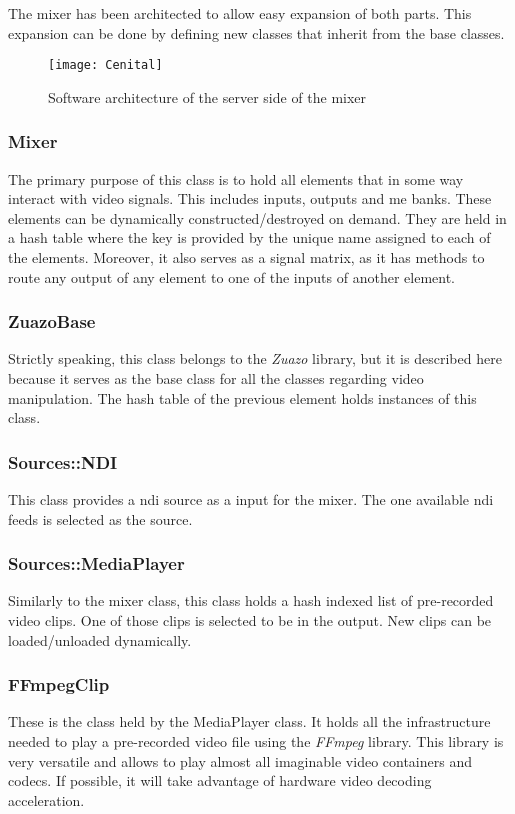 \documentclass[../main.tex]{subfiles}
\begin{document}
The mixer has been architected to allow easy expansion of both parts. This expansion can be done by defining new classes that inherit from the base classes.\newline

\begin{figure}[htbp]
    \centering
    \texttt{[image: Cenital]}

    \caption{Software architecture of the server side of the mixer}
    \label{fig:04:server_architecture}
\end{figure}

\subsubsection{Mixer}
The primary purpose of this class is to hold all elements that in some way interact with video signals. This includes inputs, outputs and \gls{me} banks. These elements can be dynamically constructed/destroyed on demand. They are held in a hash table where the key is provided by the unique name assigned to each of the elements. Moreover, it also serves as a signal matrix, as it has methods to route any output of any element to one of the inputs of another element. 

\subsubsection{ZuazoBase}
Strictly speaking, this class belongs to the \textit{Zuazo} library, but it is described here because it serves as the base class for all the classes regarding video manipulation. The hash table of the previous element holds instances of this class.

\subsubsection{Sources::NDI}
This class provides a \gls{ndi} source as a input for the mixer. The one available \gls{ndi} feeds is selected as the source.

\subsubsection{Sources::MediaPlayer}
Similarly to the mixer class, this class holds a hash indexed list of pre-recorded video clips. One of those clips is selected to be in the output. New clips can be loaded/unloaded dynamically.

\subsubsection{FFmpegClip}
These is the class held by the MediaPlayer class. It holds all the infrastructure needed to play a pre-recorded video file using the \textit{FFmpeg} library. This library is very versatile and allows to play almost all imaginable video containers and codecs. If possible, it will take advantage of hardware video decoding acceleration.\newline
\end{document}
